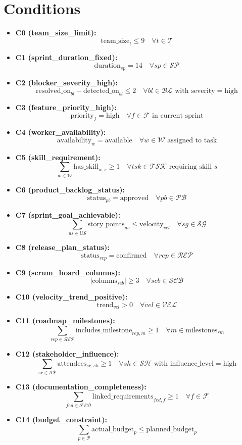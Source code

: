 \documentclass{article}
\begin{document}
\section{Conditions}
\begin{itemize}
    \item \textbf{C0 (team\_size\_limit):}
    \[
    \text{team\_size}_t \leq 9 \quad \forall t \in \mathcal{T}
    \]
    \item \textbf{C1 (sprint\_duration\_fixed):}
    \[
    \text{duration}_{sp} = 14 \quad \forall sp \in \mathcal{SP}
    \]
    \item \textbf{C2 (blocker\_severity\_high):}
    \[
    \text{resolved\_on}_{bl} - \text{detected\_on}_{bl} \leq 2 \quad \forall bl \in \mathcal{BL} \text{ with severity} = \text{high}
    \]
    \item \textbf{C3 (feature\_priority\_high):}
    \[
    \text{priority}_f = \text{high} \quad \forall f \in \mathcal{F} \text{ in current sprint}
    \]
    \item \textbf{C4 (worker\_availability):}
    \[
    \text{availability}_w = \text{available} \quad \forall w \in \mathcal{W} \text{ assigned to task}
    \]
    \item \textbf{C5 (skill\_requirement):}
    \[
    \sum_{w \in \mathcal{W}} \text{has\_skill}_{w,s} \geq 1 \quad \forall tsk \in \mathcal{TSK} \text{ requiring skill } s
    \]
    \item \textbf{C6 (product\_backlog\_status):}
    \[
    \text{status}_{pb} = \text{approved} \quad \forall pb \in \mathcal{PB}
    \]
    \item \textbf{C7 (sprint\_goal\_achievable):}
    \[
    \sum_{us \in \mathcal{US}} \text{story\_points}_{us} \leq \text{velocity}_{vel} \quad \forall sg \in \mathcal{SG}
    \]
    \item \textbf{C8 (release\_plan\_status):}
    \[
    \text{status}_{rep} = \text{confirmed} \quad \forall rep \in \mathcal{REP}
    \]
    \item \textbf{C9 (scrum\_board\_columns):}
    \[
    |\text{columns}_{scb}| \geq 3 \quad \forall scb \in \mathcal{SCB}
    \]
    \item \textbf{C10 (velocity\_trend\_positive):}
    \[
    \text{trend}_{vel} > 0 \quad \forall vel \in \mathcal{VEL}
    \]
    \item \textbf{C11 (roadmap\_milestones):}
    \[
    \sum_{rep \in \mathcal{REP}} \text{includes\_milestone}_{rep,m} \geq 1 \quad \forall m \in \text{milestones}_{rm}
    \]
    \item \textbf{C12 (stakeholder\_influence):}
    \[
    \sum_{sr \in \mathcal{SR}} \text{attendees}_{sr,sh} \geq 1 \quad \forall sh \in \mathcal{SH} \text{ with influence\_level} = \text{high}
    \]
    \item \textbf{C13 (documentation\_completeness):}
    \[
    \sum_{fed \in \mathcal{FED}} \text{linked\_requirements}_{fed,f} \geq 1 \quad \forall f \in \mathcal{F}
    \]
    \item \textbf{C14 (budget\_constraint):}
    \[
    \sum_{p \in \mathcal{P}} \text{actual\_budget}_p \leq \text{planned\_budget}_p
    \]
\end{itemize}
\end{document}
